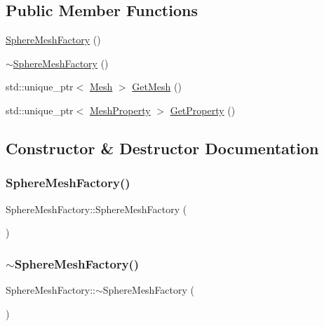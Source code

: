 \subsection*{Public Member Functions}
\begin{DoxyCompactItemize}
\item 
\mbox{\hyperlink{class_sphere_mesh_factory_ae9d1dd79ab6130040200e79bc27aa48a}{Sphere\+Mesh\+Factory}} ()
\item 
\mbox{\hyperlink{class_sphere_mesh_factory_a6c935967e01d1ebedda748c4ff010683}{$\sim$\+Sphere\+Mesh\+Factory}} ()
\item 
std\+::unique\+\_\+ptr$<$ \mbox{\hyperlink{class_mesh}{Mesh}} $>$ \mbox{\hyperlink{class_sphere_mesh_factory_a1af7ab44a55adea946466d4729cb2b52}{Get\+Mesh}} ()
\item 
std\+::unique\+\_\+ptr$<$ \mbox{\hyperlink{class_mesh_property}{Mesh\+Property}} $>$ \mbox{\hyperlink{class_sphere_mesh_factory_af19b3922356cc71d20213556b0eb98a6}{Get\+Property}} ()
\end{DoxyCompactItemize}


\subsection{Constructor \& Destructor Documentation}
\mbox{\label{class_sphere_mesh_factory_ae9d1dd79ab6130040200e79bc27aa48a}} 
\subsubsection{\texorpdfstring{SphereMeshFactory()}{SphereMeshFactory()}}
{\footnotesize\ttfamily Sphere\+Mesh\+Factory\+::\+Sphere\+Mesh\+Factory (\begin{DoxyParamCaption}{ }\end{DoxyParamCaption})}

\mbox{\label{class_sphere_mesh_factory_a6c935967e01d1ebedda748c4ff010683}} 
\subsubsection{\texorpdfstring{$\sim$SphereMeshFactory()}{~SphereMeshFactory()}}
{\footnotesize\ttfamily Sphere\+Mesh\+Factory\+::$\sim$\+Sphere\+Mesh\+Factory (\begin{DoxyParamCaption}{ }\end{DoxyParamCaption})}



